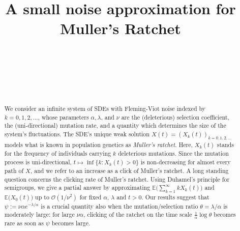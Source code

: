 \documentclass{imsart}
\theoremstyle{plain}
\theoremstyle{definition}
\begin{document}
\begin{frontmatter}
\title{A small noise approximation for Muller's Ratchet}

\begin{aug}
\author[A]{~ }
\author[A]{~}
\author[B]{~}
\address[A]{Department of Mathematical Stochastics,
University of Freiburg}

\address[B]{Department of Mathematics,
University of Frankfurt }
\end{aug}

\begin{abstract}
We consider an infinite system of SDEs with Fleming-Viot noise indexed by $k=0,1,2,...$, whose parameters $\alpha,\lambda$, and $\nu$ are the (deleterious) selection coefficient, the (uni-directional) mutation rate, and a quantity which determines the size of the system’s fluctuations.   The SDE's unique weak solution $X(t) = (X_k(t))_{k=0,1,2,...}$ models what is known in population genetics as \emph{Muller's ratchet}. Here, $X_k(t)$ stands for the frequency of individuals carrying $k$ deleterious mutations. Since the mutation process is uni-directional, $t\mapsto \inf\{k: X_k(t)> 0\}$ is non-decreasing for almost every path of $X$, and we refer to an increase as a click of Muller's ratchet. A long standing question concerns the clicking rate of Muller's ratchet. Using Duhamel's principle for semigroups, we give a partial answer by approximating $\mathbb E\Big(\sum_{k=1}^\infty kX_k(t) \Big)$ and $\mathbb E\big(X_0(t)\big)$ up to $\mathcal O(1/\nu^2)$ for fixed $\alpha$, $\lambda$ and $t>0$. Our results suggest that  $\psi:=\nu \alpha e^{-\lambda/\alpha}$ is a crucial quantity  also when the mutation/selection ratio $\theta = \lambda/\alpha$ is moderately large:   for large $\nu \alpha$, clicking of the ratchet on the time scale $\tfrac 1\alpha \log \theta$ becomes rare as soon as $\psi$ becomes large.
\end{abstract}


\end{frontmatter}
\end{document}
